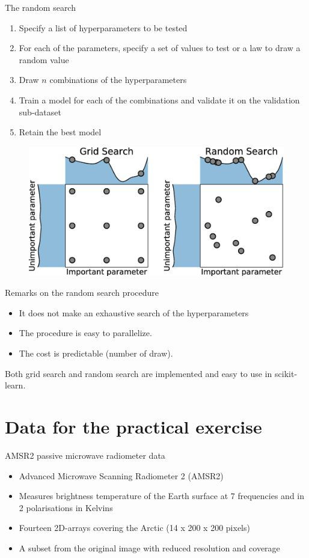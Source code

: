 \documentclass[handout, 10pt]{beamer}
\begin{document}
\begin{frame}{The random search}
\begin{enumerate}
    \item Specify a list of hyperparameters to be tested
    \item For each of the parameters, specify a set of values to test or a law to draw a random value
    \item Draw $n$ combinations of the hyperparameters
    \item Train a model for each of the combinations and validate it on the validation sub-dataset
    \item Retain the best model
\end{enumerate}
\begin{figure}
    \centering
    \includegraphics[width=.7\textwidth]{cIDuR2.png}
\end{figure}
\end{frame}

\begin{frame}{Remarks on the random search procedure}
\begin{itemize}
    \item It \alert{does not make} an \alert{exhaustive} search of the hyperparameters
    \item The procedure is easy to \alert{parallelize}.
    \item The cost is predictable (number of draw).
\end{itemize}
\pause
Both grid search and random search are implemented and easy to use in scikit-learn.
\end{frame}


\section{Data for the practical exercise}

\begin{frame}{AMSR2 passive microwave radiometer data}
\begin{itemize}
    \item Advanced Microwave Scanning Radiometer 2 (\alert{AMSR2}) 
    \item Measures \alert{brightness temperature} of the Earth surface at 7 frequencies and in 2 polarisations in Kelvins
    \item Fourteen 2D-arrays covering the Arctic (\alert{14 x 200 x 200} pixels)
    \item A subset from the original image with reduced resolution and coverage
\end{itemize}
\end{frame}
\end{document}
